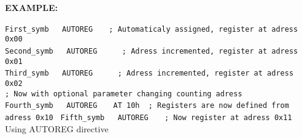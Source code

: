                \textbf{EXAMPLE:}\\
                        \begin{code}[h!]
                        \mysmallfont{}
                                {\color{highlight_symbol}\verb'First_symb'}\verb'   '{\color{highlight_directive}\verb'AUTOREG'}\verb'   '
                                {\color{highlight_comment}\verb'; Automaticaly assigned, register at adress 0x00'}\\
                                {\color{highlight_symbol}\verb'Second_symb'}\verb'   '{\color{highlight_directive}\verb'AUTOREG'}\verb'   '
                                \verb'  '{\color{highlight_comment}\verb'; Adress incremented, register at adress 0x01 '}\\
                                {\color{highlight_symbol}\verb'Third_symb'}\verb'   '{\color{highlight_directive}\verb'AUTOREG'}\verb'   '
                                \verb'  '{\color{highlight_comment}\verb'; Adress incremented, register at adress 0x02 '}\\
                                {\color{highlight_comment}\verb'; Now with optional parameter changing counting adress '}\\
                                {\color{highlight_symbol}\verb'Fourth_symb'}\verb'   '{\color{highlight_directive}\verb'AUTOREG'}\verb'   '
                                {\color{highlight_symbol}\verb'AT 10h'}\verb'  '{\color{highlight_comment}\verb'; Registers are now defined from adress 0x10 '}
                                {\color{highlight_symbol}\verb'Fifth_symb'}\verb'   '{\color{highlight_directive}\verb'AUTOREG'}\verb'   '
                                {\color{highlight_comment}\verb'; Now register at adress 0x11'}\\
                        \caption{Using AUTOREG directive}
                    \end{code}

